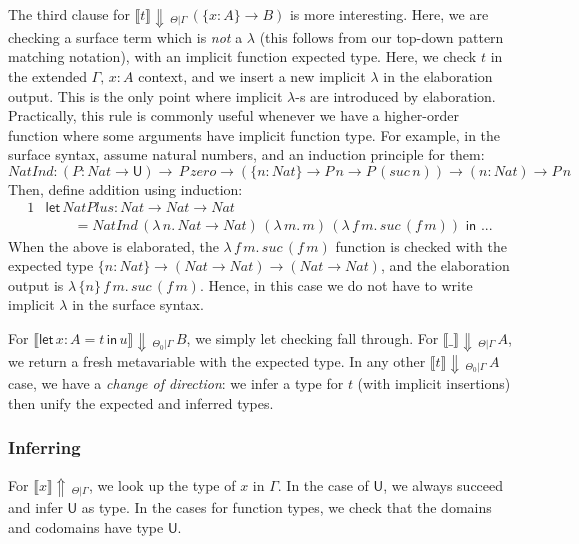 \documentclass[acmsmall,screen,dvipsnames]{acmart}\settopmatter{}
\newcommand{\slet}{\boldsymbol{\mathsf{let}}}
\renewcommand{\sin}{\boldsymbol{\mathsf{in}}}
\renewcommand{\U}{\mathsf{U}}
\newcommand{\mi}[1]{\mathit{#1}}
\newcommand{\echeck}[4]{\llbracket#1\rrbracket\!\Downarrow\,_{#2|#3}\,#4}
\newcommand{\einfer}[3]{\llbracket#1\rrbracket\!\Uparrow\,_{#2|#3}}
\theoremstyle{remark}
\begin{document}
The third clause for $\echeck{t}{\Theta}{\Gamma}{(\{x : A\}\to B)}$ is more
interesting. Here, we are checking a surface term which is \emph{not} a
$\lambda$ (this follows from our top-down pattern matching notation), with an
implicit function expected type. Here, we check $t$ in the extended $\Gamma,\,x
: A$ context, and we insert a new implicit $\lambda$ in the elaboration
output. This is the only point where implicit $\lambda$-s are introduced by
elaboration. Practically, this rule is commonly useful whenever we have a
higher-order function where some arguments have implicit function type. For
example, in the surface syntax, assume natural numbers, and an induction
principle for them:
\[
\mi{NatInd} : (P : \mi{Nat} \to \U)\to \,P\,\mi{zero} \to (\{n : \mi{Nat}\}\to P\,n \to
         P\,(\mi{suc}\,n)) \to (n : \mi{Nat}) \to P\,n
\]
Then, define addition using induction:
\begin{alignat*}{1}
& \slet\, \mi{NatPlus} : \mi{Nat} \to \mi{Nat} \to \mi{Nat}\\
& \qquad = \mi{NatInd}\,(\lambda\,n.\,\mi{Nat}\to \mi{Nat})\,(\lambda\,m.\,m)\,
                        (\lambda\,f\,m.\,\mi{suc}\,(f\,m))\,\,\sin\,\,...
\end{alignat*}
When the above is elaborated, the $\lambda\,f\,m.\,\mi{suc}\,(f\,m)$ function is
checked with the expected type $\{n : \mi{Nat}\}\to (\mi{Nat} \to \mi{Nat}) \to
(\mi{Nat} \to \mi{Nat})$, and the elaboration output is
$\lambda\,\{n\}\,f\,m.\,\mi{suc}\,(f\,m)$.  Hence, in this case we do not have
to write implicit $\lambda$ in the surface syntax.

For $\echeck{\slet\,x:A=t\,\sin\,u}{\Theta_0}{\Gamma}{B}$, we simply let
checking fall through. For $\echeck{\_}{\Theta}{\Gamma}{A}$, we return a fresh
metavariable with the expected type. In any other
$\echeck{t}{\Theta_0}{\Gamma}{A}$ case, we have a \emph{change of direction}: we
infer a type for $t$ (with implicit insertions) then unify the expected and
inferred types.

\subsubsection{Inferring}

For $\einfer{x}{\Theta}{\Gamma}$, we look up the type of $x$ in $\Gamma$. In the
case of $\U$, we always succeed and infer $\U$ as type. In the cases for
function types, we check that the domains and codomains have type $\U$.
\end{document}
